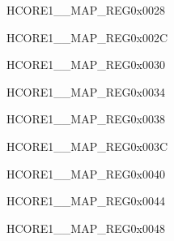 \begin{register}{H}{CORE1\_\_MAP\_REG}{0x0028}\label{regdesc:CORE1LPGPIOINTMAPREG}
\end{register}\vspace{-3em}


\begin{register}{H}{CORE1\_\_MAP\_REG}{0x002C}\label{regdesc:CORE1LPI2CINTMAPREG}
\end{register}\vspace{-3em}


\begin{register}{H}{CORE1\_\_MAP\_REG}{0x0030}\label{regdesc:CORE1LPI2SINTMAPREG}
\end{register}\vspace{-3em}


\begin{register}{H}{CORE1\_\_MAP\_REG}{0x0034}\label{regdesc:CORE1LPSPIINTMAPREG}
\end{register}\vspace{-3em}


\begin{register}{H}{CORE1\_\_MAP\_REG}{0x0038}\label{regdesc:CORE1LPTOUCHINTMAPREG}
\end{register}\vspace{-3em}


\begin{register}{H}{CORE1\_\_MAP\_REG}{0x003C}\label{regdesc:CORE1LPTSENSINTMAPREG}
\end{register}\vspace{-3em}


\begin{register}{H}{CORE1\_\_MAP\_REG}{0x0040}\label{regdesc:CORE1LPUARTINTMAPREG}
\end{register}\vspace{-3em}


\begin{register}{H}{CORE1\_\_MAP\_REG}{0x0044}\label{regdesc:CORE1LPEFUSEINTMAPREG}
\end{register}\vspace{-3em}


\begin{register}{H}{CORE1\_\_MAP\_REG}{0x0048}\label{regdesc:CORE1LPSWINTMAPREG}
\end{register}\vspace{-3em}


